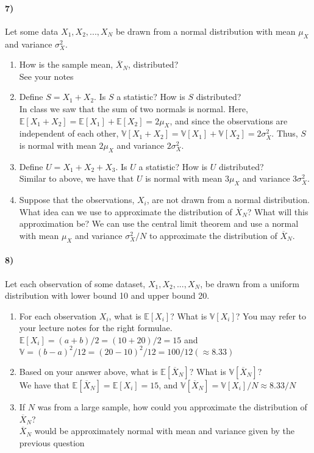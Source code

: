 \documentclass[12pt]{article}
\newcommand\ov{\overline}
\newcommand\BB{\mathbb}
\newcommand\EE{\mathbb{E}}
\numberwithin{equation}{section}
\numberwithin{figure}{section}
\numberwithin{table}{section}
\begin{document}
\paragraph{7)} Let some data $X_1,X_2,...,X_N$ be drawn from a normal distribution with mean $\mu_{X}$ and variance $\sigma^2_{X}$.
\begin{enumerate}
\item How is the sample mean, $\ov{X}_{N}$, distributed? \\
{\color{blue} See your notes}
\item Define $S = X_1+X_2$. Is $S$ a statistic? How is $S$ distributed? \\
{\color{blue} In class we saw that the sum of two normals is normal. Here, $\EE[X_1+X_2] = \EE[X_1]+\EE[X_2] = 2\mu_{X}$, and since the observations are independent of each other, $\BB{V}[X_1+X_2]=\BB{V}[X_1]+\BB{V}[X_2] = 2\sigma_{X}^2$. Thus, $S$ is normal with mean $2\mu_{X}$ and variance $2\sigma^2_{X}$.}
\item Define $U = X_1+X_2+X_3$. Is $U$ a statistic? How is $U$ distributed? \\
{\color{blue} Similar to above, we have that $U$ is normal with mean $3\mu_{X}$ and variance $3\sigma^2_{X}$.}
\item Suppose that the observations, $X_i$, are not drawn from a normal distribution. What idea can we use to approximate the distribution of $\ov{X}_N$? What will this approximation be?
{\color{blue} We can use the central limit theorem and use a normal with mean $\mu_{X}$ and variance $\sigma^2_{X}/N$ to approximate the distribution of $\ov{X}_N$.}
\end{enumerate}

\paragraph{8)} Let each observation of some dataset, $X_1,X_2,...,X_N$, be drawn from a uniform distribution with lower bound 10 and upper bound 20.
\begin{enumerate}
\item For each observation $X_i$, what is $\EE[X_i]$? What is $\BB{V}[X_i]$? You may refer to your lecture notes for the right formulae. \\
{\color{blue} $\EE[X_i] = (a+b)/2 = (10+20)/2 = 15$ and $\BB{V} = (b-a)^2/12 = (20-10)^2/12 = 100/12 (\approx 8.33)$}
\item Based on your answer above, what is $\EE[\ov{X}_N]$? What is $\BB{V}[\ov{X}_N]$? \\
{\color{blue} We have that $\EE[\ov{X}_N] = \EE[X_i] = 15$, and $\BB{V}[\ov{X}_N] = \BB{V}[X_i]/N \approx 8.33/N$}
\item If $N$ was from a large sample, how could you approximate the distribution of $\ov{X}_N$? \\
{\color{blue}$\ov{X}_N$ would be approximately normal with mean and variance given by the previous question}
\end{enumerate}
\end{document}
